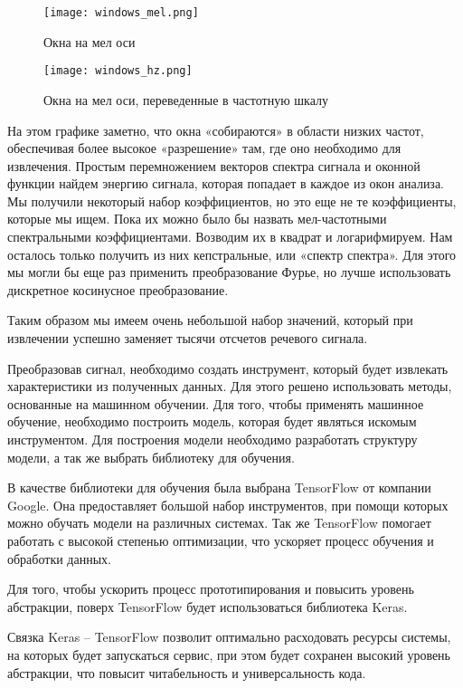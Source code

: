 \begin{figure}[h]
\centering
	\texttt{[image: windows\_mel.png]}
	\caption{Окна на мел оси}
	\label{sec:design:dev:windows}
\end{figure}

\begin{figure}[h]
\centering
	\texttt{[image: windows\_hz.png]}
	\caption{Окна на мел оси, переведенные в частотную шкалу}
	\label{sec:design:dev:windows_mel}
\end{figure}

На этом графике заметно, что окна «собираются» в области низких частот, обеспечивая более высокое «разрешение» там, где оно необходимо для извлечения. Простым перемножением векторов спектра сигнала и оконной функции найдем энергию сигнала, которая попадает в каждое из окон анализа. Мы получили некоторый набор коэффициентов, но это еще не те коэффициенты, которые мы ищем. Пока их можно было бы назвать мел-частотными спектральными коэффициентами. Возводим их в квадрат и логарифмируем. Нам осталось только получить из них кепстральные, или «спектр спектра». Для этого мы могли бы еще раз применить преобразование Фурье, но лучше использовать дискретное косинусное преобразование.

Таким образом мы имеем очень небольшой набор значений, который при извлечении успешно заменяет тысячи отсчетов речевого сигнала.

Преобразовав сигнал, необходимо создать инструмент, который будет извлекать характеристики из полученных данных. Для этого решено использовать методы, основанные на машинном обучении. Для того, чтобы применять машинное обучение, необходимо построить модель, которая будет являться искомым инструментом. Для построения модели необходимо разработать структуру модели, а так же выбрать библиотеку для обучения.

В качестве библиотеки для обучения была выбрана TensorFlow от компании Google. Она предоставляет большой набор инструментов, при помощи которых можно обучать модели на различных системах. Так же TensorFlow помогает работать с высокой степенью оптимизации, что ускоряет процесс обучения и обработки данных.

Для того, чтобы ускорить процесс прототипирования и повысить уровень абстракции, поверх TensorFlow будет использоваться библиотека Keras.

Связка Keras -- TensorFlow позволит оптимально расходовать ресурсы системы, на которых будет запускаться сервис, при этом будет сохранен высокий уровень абстракции, что повысит читабельность и универсальность кода.

